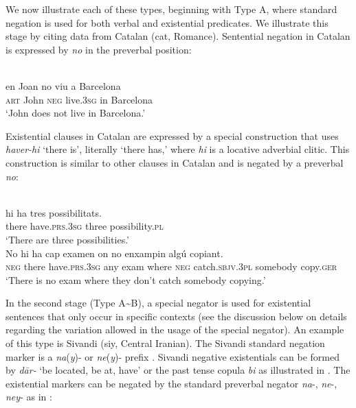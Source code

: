 \documentclass[output=paper]{langsci/langscibook}
\begin{document}
We now illustrate each of these types, beginning with Type A, where standard negation is used for both verbal and existential predicates. We illustrate this stage by citing data from Catalan (cat, Romance). Sentential negation in Catalan is expressed by \textit{no} in the preverbal position: 
%
\begin{exe}\ex\label{ex:ieur-catalan-Barcelona}
\\
    \gll en    Joan   no     viu          a   Barcelona \\
\textsc{art}  John    \textsc{neg}   live.\textsc{3sg}   in Barcelona \\
    \glt `John does not live in Barcelona.' %
    \end{exe}

Existential clauses in Catalan are expressed by a special construction that uses \textit{haver-hi} `there is', literally `there has,' where \textit{hi} is a locative adverbial clitic. This construction is similar to other clauses in Catalan and is negated by a preverbal \textit{no}: 

\begin{exe}\ex\label{ex:ieur-catalan-possibilities}
\\
    \gll hi      ha                  tres   possibilitats.  \\
there have.\textsc{prs}.\textsc{3sg} three possibility.\textsc{pl} \\
    \glt `There are three possibilities.' 
\ex\label{ex:ieur-catalan-copying}
\\
    \gll No hi ha cap examen on no enxampin algú copiant.  \\
\textsc{neg}   there have.\textsc{prs.3sg}   any exam 
where \textsc{neg}   catch.\textsc{sbjv.3pl}   somebody  copy.\textsc{ger}\\
    \glt `There is no exam where they don't catch somebody copying.' 
    \end{exe}

In the second stage (Type A{\textasciitilde}B), a special negator is used
for existential sentences that only occur in specific contexts (see the
discussion below on details regarding the variation allowed in the usage of
the special negator). An example of this type is Sivandi (siy, Central
Iranian). The Sivandi standard negation marker is a \textit{na}(\textit{y})- or
\textit{ne}(\textit{y})- prefix \citep[69]{Lecoq1979}. Sivandi negative existentials
can be formed by \textit{dār-} `be located, be at, have' or the past tense
copula \textit{bi} as illustrated in . The existential
markers can be negated by the standard preverbal negator \textit{na}-,
\textit{ne}-, \textit{ney}- as in :
\end{document}
